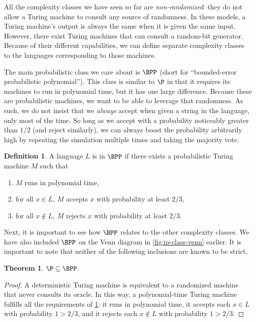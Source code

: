 \documentclass[english,12pt]{reedthesis}
\theoremstyle{plain}
\newtheorem{thm}{Theorem}[section]
\theoremstyle{definition}
\newtheorem{defn}[defn]{Definition}
\theoremstyle{remark}
\begin{document}
All the complexity classes we have seen so far are \emph{non-randomized}: they
do not allow a Turing machine to consult any source of randomness. In these
models, a Turing machine's output is always the same when it is given the same
input. However, there exist Turing machines that can consult a random-bit
generator. Because of their different capabilities, we can define separate
complexity classes to the languages corresponding to those machines.

The main probabilistic class we care about is $\BPP$ (short for ``bounded-error
probabilistic polynomial''). This class is similar to $\P$ in that it requires
its machines to run in polynomial time, but it has one large difference. Because
these are probabilistic machines, we want to be able to leverage that
randomness. As such, we do not insist that we \emph{always} accept when given a
string in the language, only most of the time. So long as we accept with a
probability noticeably greater than $1/2$ (and reject similarly), we can always
boost the probability arbitrarily high by repeating the simulation multiple
times and taking the majority vote.

\begin{defn}\label{def:bpp}
  A language $L$ is in $\BPP$ if there exists a probabilistic Turing machine $M$
  such that
  \begin{enumerate}
    \item $M$ runs in polynomial time,
    \item for all $x \in L$, $M$ accepts $x$ with probability at least $2/3$,
    \item for all $x \notin L$, $M$ rejects $x$ with probability at least $2/3$.
  \end{enumerate}
\end{defn}

Next, it is important to see how $\BPP$ relates to the other complexity classes.
We have also included $\BPP$ on the Venn diagram in \cref{fig:ip-class-venn}
earlier. It is important to note that neither of the following inclusions are
known to be strict.

\begin{thm}\label{thm:p-subset-bpp}
  $\P \subseteq \BPP$.
\end{thm}

\begin{proof}
  A deterministic Turing machine is equivalent to a randomized machine that
  never consults its oracle. In this way, a polynomial-time Turing machine
  fulfills all the requirements of \cref{def:bpp}: it runs in polynomial time,
  it accepts each $x \in L$ with probability $1 > 2/3$, and it rejects each
  $x \notin L$ with probability $1 > 2/3$.
\end{proof}
\end{document}
